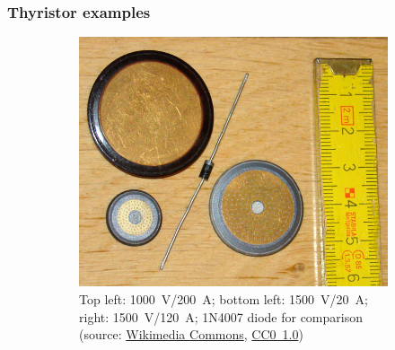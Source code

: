 \begin{frame}[b]
    \frametitle{Thyristor examples}
    \begin{figure}
        \begin{subfigure}{0.45\textwidth}
            \centering
			\includegraphics[height=0.45\textheight]{fig/lec05/Thyristor_example_01.jpg}
			\caption{Top left: \SI{1000}{\volt}/\SI{200}{\ampere}; bottom left: \SI{1500}{\volt}/\SI{20}{\ampere}; right: \SI{1500}{\volt}/\SI{120}{\ampere}; 1N4007 diode for comparison (source: \href{https://de.wikipedia.org/wiki/Datei:SCR_power_rectifiers.jpg}{Wikimedia Commons}, \href{https://creativecommons.org/publicdomain/zero/1.0/}{CC0~1.0})}
        \end{subfigure}
        \hspace{1cm}
        \begin{subfigure}{0.45\textwidth}
            \centering

\end{subfigure}
\end{figure}
\end{frame}
